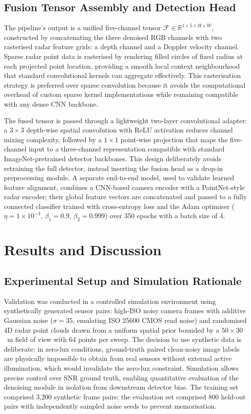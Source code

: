 \documentclass[conference]{IEEEtran}
\begin{document}
\subsection{Fusion Tensor Assembly and Detection Head}
The pipeline's output is a unified five-channel tensor $\mathcal{F} \in \mathbb{R}^{1 \times 5 \times H \times W}$, constructed by concatenating the three denoised RGB channels with two rasterised radar feature grids: a depth channel and a Doppler velocity channel. Sparse radar point data is rasterised by rendering filled circles of fixed radius at each projected point location, providing a smooth local context neighbourhood that standard convolutional kernels can aggregate effectively. This rasterisation strategy is preferred over sparse convolution because it avoids the computational overhead of custom sparse kernel implementations while remaining compatible with any dense CNN backbone.

The fused tensor is passed through a lightweight two-layer convolutional adapter: a $3 \times 3$ depth-wise spatial convolution with ReLU activation reduces channel mixing complexity, followed by a $1 \times 1$ point-wise projection that maps the five-channel input to a three-channel representation compatible with standard ImageNet-pretrained detector backbones. This design deliberately avoids retraining the full detector, instead inserting the fusion head as a drop-in preprocessing module. A separate end-to-end model, used to validate learned feature alignment, combines a CNN-based camera encoder with a PointNet-style radar encoder; their global feature vectors are concatenated and passed to a fully connected classifier trained with cross-entropy loss and the Adam optimiser ($\eta = 1 \times 10^{-3}$, $\beta_1 = 0.9$, $\beta_2 = 0.999$) over 350 epochs with a batch size of 4.

\section{Results and Discussion}

\subsection{Experimental Setup and Simulation Rationale}
Validation was conducted in a controlled simulation environment using synthetically generated sensor pairs: high-ISO noisy camera frames with additive Gaussian noise ($\sigma = 35$, emulating ISO 25600 CMOS read noise) and randomised 4D radar point clouds drawn from a uniform spatial prior bounded by a $50 \times 30$~m field of view with 64 points per sweep. The decision to use synthetic data is deliberate: in zero-lux conditions, ground-truth paired clean-noisy image labels are physically impossible to obtain from real sensors without external active illumination, which would invalidate the zero-lux constraint. Simulation allows precise control over SNR ground truth, enabling quantitative evaluation of the denoising module in isolation from downstream detector bias. The training set comprised 3,200 synthetic frame pairs; the evaluation set comprised 800 held-out pairs with independently sampled noise seeds to prevent memorisation.
\end{document}
